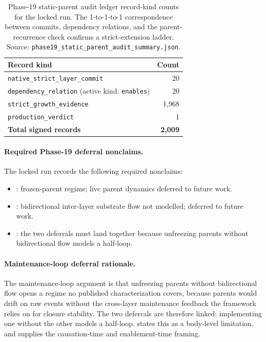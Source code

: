 \documentclass{article}
\theoremstyle{definition}
\begin{document}
\begin{table}[t]
  \centering
  \small
  \caption{Phase-19 static-parent audit ledger record-kind counts for the locked run. The 1-to-1-to-1 correspondence between commits, dependency relations, and the parent-recurrence check confirms a strict-extension ladder. Source: \texttt{phase19\_static\_parent\_audit\_summary.json}.}
  \label{tab:audit-ledger}
  \begin{tabularx}{\linewidth}{@{}>{\raggedright\arraybackslash}Xr@{}}
    \toprule
    Record kind & Count \\
    \midrule
    \texttt{native\_strict\_layer\_commit} & 20 \\
    \texttt{dependency\_relation} (active kind: \texttt{enables}) & 20 \\
    \texttt{strict\_growth\_evidence} & 1{,}968 \\
    \texttt{production\_verdict} & 1 \\
    \textbf{Total signed records} & \textbf{2{,}009} \\
    \bottomrule
  \end{tabularx}
\end{table}
 
\paragraph{Required Phase-19 deferral nonclaims.}
The locked run records the following required nonclaims:
\begin{itemize}
\item {}: frozen-parent regime; live parent dynamics deferred to future work.
\item {}: bidirectional inter-layer substrate flow not modelled; deferred to future work.
\item {}: the two deferrals must land together because unfreezing parents without bidirectional flow models a half-loop.
\end{itemize}

\paragraph{Maintenance-loop deferral rationale.}
The maintenance-loop argument is that unfreezing parents without bidirectional flow opens a regime no published characterization covers, because parents would drift on raw events without the cross-layer maintenance feedback the framework relies on for closure stability. The two deferrals are therefore linked: implementing one without the other models a half-loop.  states this as a body-level limitation, and \cite{Tsiokos2026NotchAStone} supplies the causation-time and enablement-time framing.
\end{document}
